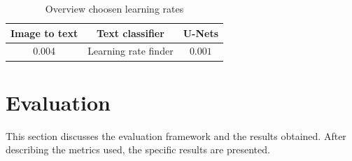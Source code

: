 \documentclass[conference]{IEEEtran}
\begin{document}
\begin{table}[htbp]
\caption{Overview choosen learning rates}
\begin{center}
\begin{tabular}{|c|c|c|}
\hline
Image to text & Text classifier & U-Nets \\
\hline
0.004 & Learning rate finder \cite{smith2017cyclical} & $0.001$ \\
\hline
\end{tabular}
\label{learning_rates}
\end{center}
\end{table}

\section{Evaluation}\label{evaluation}
This section discusses the evaluation framework and the results obtained. After describing the metrics used, the specific results are presented. 
\end{document}
